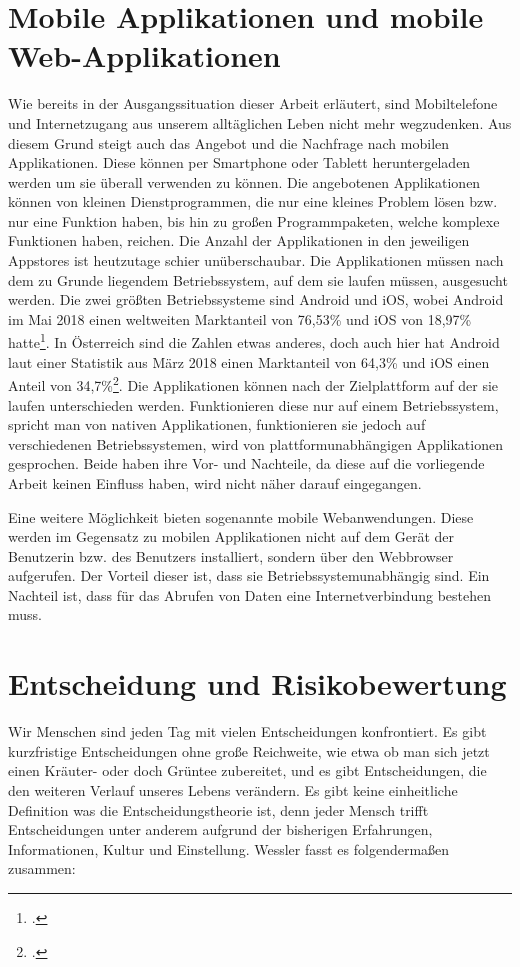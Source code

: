 \section{Mobile Applikationen und mobile Web-Applikationen}

Wie bereits in der Ausgangssituation dieser Arbeit erläutert, sind Mobiltelefone und Internetzugang aus unserem alltäglichen Leben nicht mehr wegzudenken. Aus diesem Grund steigt auch das Angebot und die Nachfrage nach mobilen Applikationen. Diese können per Smartphone oder Tablett heruntergeladen werden um sie überall verwenden zu können. Die angebotenen Applikationen können von kleinen Dienstprogrammen, die nur eine kleines Problem lösen bzw. nur eine Funktion haben, bis hin zu großen Programmpaketen, welche komplexe Funktionen haben, reichen. Die Anzahl der Applikationen in den jeweiligen Appstores ist heutzutage schier unüberschaubar. Die Applikationen müssen nach dem zu Grunde liegendem Betriebssystem, auf dem sie laufen müssen, ausgesucht werden. Die zwei größten Betriebssysteme sind Android und iOS, wobei Android im Mai 2018 einen weltweiten Marktanteil von 76,53\% und iOS von 18,97\% hatte\footcite{mobileos}. In Österreich sind die Zahlen etwas anderes, doch auch hier hat Android laut einer Statistik aus März 2018 einen Marktanteil von 64,3\% und iOS einen Anteil von 34,7\%\footcite{stat}.
Die Applikationen können nach der Zielplattform auf der sie laufen unterschieden werden. Funktionieren diese nur auf einem Betriebssystem, spricht man von nativen Applikationen, funktionieren sie jedoch auf verschiedenen Betriebssystemen, wird von plattformunabhängigen Applikationen gesprochen. Beide haben ihre Vor- und Nachteile, da diese auf die vorliegende Arbeit keinen Einfluss haben, wird nicht näher darauf eingegangen.

Eine weitere Möglichkeit bieten sogenannte mobile Webanwendungen. Diese werden im Gegensatz zu mobilen Applikationen nicht auf dem Gerät der Benutzerin bzw. des Benutzers installiert, sondern über den Webbrowser aufgerufen. Der Vorteil dieser ist, dass sie Betriebssystemunabhängig sind. Ein Nachteil ist, dass für das Abrufen von Daten eine Internetverbindung bestehen muss.

\section{Entscheidung und Risikobewertung}

Wir Menschen sind jeden Tag mit vielen Entscheidungen konfrontiert. Es gibt kurzfristige Entscheidungen ohne große Reichweite, wie etwa ob man sich jetzt einen Kräuter- oder doch Grüntee zubereitet, und es gibt Entscheidungen, die den weiteren Verlauf unseres Lebens verändern. Es gibt keine einheitliche Definition was die Entscheidungstheorie ist, denn jeder Mensch trifft Entscheidungen unter anderem aufgrund der bisherigen Erfahrungen, Informationen, Kultur und Einstellung. Wessler fasst es folgendermaßen zusammen:

